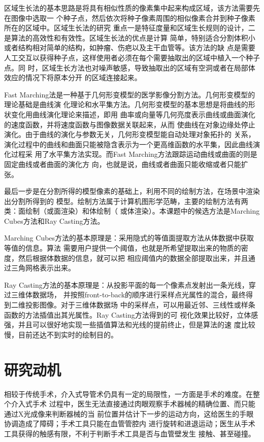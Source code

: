 区域生长法的基本思路是将具有相似性质的像素集中起来构成区域，该方法需要先在图像中选取一
个种子点，然后依次将种子像素周围的相似像素合并到种子像素所在的区域中。区域生长法的研究
重点一是特征度量和区域生长规则的设计，二是算法的高效性和有效性。区域生长法的优点是计算
简单，特别适合分割体积小或者结构相对简单的结构，如肿瘤、伤疤以及主干血管等。该方法的缺
点是需要人工交互以获得种子点，这样使用者必须在每个需要抽取出的区域中植入一个种子点。同
时，区域生长方法也对噪声敏感，导致抽取出的区域有空洞或者在局部体效应的情况下将原本分开
的区域连接起来。

Fast Marching法是一种基于几何形变模型的医学影像分割方法。几何形变模型的理论基础是曲线演
化理论和水平集方法。几何形变模型的基本思想是将曲线的形状变化用曲线演化理论来描述，即用
曲率或向量等几何亮度表示曲线或曲面演化的速度函数，并将速度函数与图像数据关联起来，从而
使曲线在对象边缘处停止演化。由于曲线的演化与参数无关，几何形变模型能自动处理对象拓扑的
关系，演化过程中的曲线和曲面只能被隐含表示为一个更高维函数的水平集，因此曲线演化过程采
用了水平集方法实现。而Fast Marching方法跟踪运动曲线或曲面的则是固定曲线或者曲面的演化方
向，也就是说，曲线或者曲面只能收缩或者只能扩张。

最后一步是在分割所得的模型像素的基础上，利用不同的绘制方法，在场景中渲染出分割所得到的
模型。绘制方法属于计算机图形学范畴，主要的绘制方法有两类：面绘制（或面渲染）和体绘制（
或体渲染）。本课题中的候选方法是Marching Cubes方法和Ray Casting方法。

Marching Cubes方法的基本原理是：采用隐式的等值面提取方法从体数据中获取等值的信息。算法
需要用户提供一个阈值，也就是所希望提取出来的物质的密度，然后根据体数据的信息，就可以把
相应阈值内的数据全部提取出来，并且通过三角网格表示出来。

Ray Casting方法的基本原理是：从投影平面的每一个像素点发射出一条光线，穿过三维体数据场，
并按照front-to-back的顺序进行采样点光属性的混合，最终得到二维投影图像。对于三维体数据场
中的采样点，可以用最近邻、三线性或样条函数的方法插值出其光属性。Ray Casting方法得到的可
视化效果比较好，立体感强，并且可以很好地实现一些插值算法和光线的提前终止，但是算法的速
度比较慢，目前还达不到实时的绘制目的。

\section{研究动机}
\label{sec1-2}

相较于传统手术，介入式导管术仍具有一定的局限性，一方面是手术的难度。在整个介入式手术
过程中，医生无法直接通过肉眼观察手术器械的精确位置、而只能通过X光成像来判断器械的当
前位置并估计下一步的运动方向，这给医生的手眼协调造成了障碍；手术工具只能在血管管腔内
进行旋转和进退运动；医生从手术工具获得的触感有限，不利于判断手术工具是否与血管壁发生
接触、甚至碰撞。

